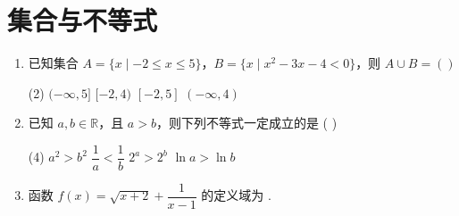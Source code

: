 \documentclass[11pt,a4paper]{article}
\begin{document}
\section*{集合与不等式}

\begin{enumerate}[label=\textbf{题 \arabic*}]

\item 已知集合 \( A = \{ x \mid -2 \leq x \leq 5 \} \)，\( B = \{ x \mid x^2 - 3x - 4 < 0 \} \)，则 \( A \cup B = ( ) \)

\begin{tasks}(2)
    \task \( (-\infty, 5] \)
    \task \( [-2, 4) \)
    \task \( [-2, 5] \)
    \task \( (-\infty, 4) \)
\end{tasks}

\item 已知 \( a, b \in \mathbb{R} \)，且 \( a > b \)，则下列不等式一定成立的是 ( )

\begin{tasks}(4)
    \task \( a^2 > b^2 \)
    \task \( \dfrac{1}{a} < \dfrac{1}{b} \)
    \task \( 2^a > 2^b \)
    \task \( \ln a > \ln b \)
\end{tasks}

\item 函数 \( f(x) = \sqrt{x+2} + \dfrac{1}{x-1} \) 的定义域为 \underline{\hspace{4cm}}.

\end{enumerate}
\end{document}
